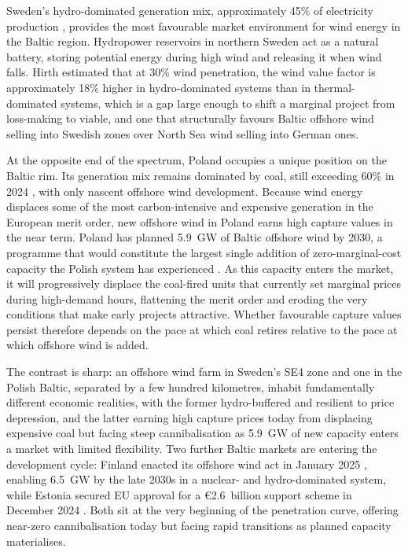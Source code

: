 Sweden's hydro-dominated generation mix, approximately 45\% of electricity production \cite{Ember2025}, provides the most favourable market environment for wind energy in the Baltic region. Hydropower reservoirs in northern Sweden act as a natural battery, storing potential energy during high wind and releasing it when wind falls. Hirth \cite{Hirth2013} estimated that at 30\% wind penetration, the wind value factor is approximately 18\% higher in hydro-dominated systems than in thermal-dominated systems, which is a gap large enough to shift a marginal project from loss-making to viable, and one that structurally favours Baltic offshore wind selling into Swedish zones over North Sea wind selling into German ones.

\vspace{4pt}

At the opposite end of the spectrum, Poland occupies a unique position on the Baltic rim. Its generation mix remains dominated by coal, still exceeding 60\% in 2024 \cite{EmberGlobal2024}, with only nascent offshore wind development. Because wind energy displaces some of the most carbon-intensive and expensive generation in the European merit order, new offshore wind in Poland earns high capture values in the near term. Poland has planned 5.9~GW of Baltic offshore wind by 2030, a programme that would constitute the largest single addition of zero-marginal-cost capacity the Polish system has experienced \cite{Owczarek2021}. As this capacity enters the market, it will progressively displace the coal-fired units that currently set marginal prices during high-demand hours, flattening the merit order and eroding the very conditions that make early projects attractive. Whether favourable capture values persist therefore depends on the pace at which coal retires relative to the pace at which offshore wind is added.

\vspace{4pt}

The contrast is sharp: an offshore wind farm in Sweden's SE4 zone and one in the Polish Baltic, separated by a few hundred kilometres, inhabit fundamentally different economic realities, with the former hydro-buffered and resilient to price depression, and the latter earning high capture prices today from displacing expensive coal but facing steep cannibalisation as 5.9~GW of new capacity enters a market with limited flexibility. Two further Baltic markets are entering the development cycle: Finland enacted its offshore wind act in January 2025 \cite{FinlandOffshoreWind2025}, enabling 6.5~GW by the late 2030s in a nuclear- and hydro-dominated system, while Estonia secured EU approval for a \euro{}2.6~billion support scheme in December 2024 \cite{EstoniaOffshoreWind2025}. Both sit at the very beginning of the penetration curve, offering near-zero cannibalisation today but facing rapid transitions as planned capacity materialises.

